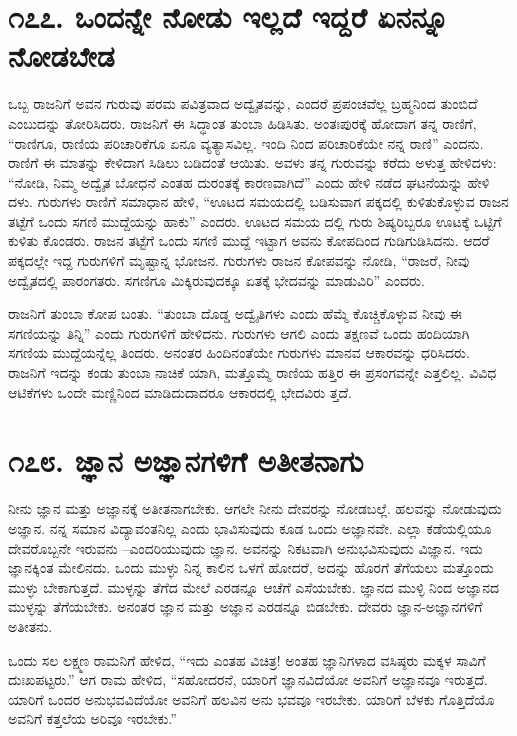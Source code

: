 \section{\num{೧೭೭. } ಒಂದನ್ನೇ ನೋಡು ಇಲ್ಲದೆ ಇದ್ದರೆ ಏನನ್ನೂ ನೋಡಬೇಡ}

ಒಬ್ಬ ರಾಜನಿಗೆ ಅವನ ಗುರುವು ಪರಮ ಪವಿತ್ರವಾದ ಅದ್ವೈತವನ್ನು, ಎಂದರೆ ಪ್ರಪಂಚವೆಲ್ಲ ಬ್ರಹ್ಮನಿಂದ ತುಂಬಿದೆ ಎಂಬುದನ್ನು ತೋರಿಸಿದರು. ರಾಜನಿಗೆ ಈ ಸಿದ್ಧಾಂತ ತುಂಬಾ ಹಿಡಿಸಿತು. ಅಂತಃಪುರಕ್ಕೆ ಹೋದಾಗ ತನ್ನ ರಾಣಿಗೆ, “ರಾಣಿಗೂ, ರಾಣಿಯ ಪರಿಚಾರಿಕೆಗೂ ಏನೂ ವ್ಯತ್ಯಾಸವಿಲ್ಲ. ಇಂದಿ ನಿಂದ ಪರಿಚಾರಿಕೆಯೇ ನನ್ನ ರಾಣಿ” ಎಂದನು. ರಾಣಿಗೆ ಈ ಮಾತನ್ನು ಕೇಳಿದಾಗ ಸಿಡಿಲು ಬಡಿದಂತೆ ಆಯಿತು. ಅವಳು ತನ್ನ ಗುರುವನ್ನು ಕರೆದು ಅಳುತ್ತ ಹೇಳಿದಳು: “ನೋಡಿ, ನಿಮ್ಮ ಅದ್ವೈತ ಬೋಧನೆ ಎಂತಹ ದುರಂತಕ್ಕೆ ಕಾರಣವಾಗಿದೆ” ಎಂದು ಹೇಳಿ ನಡೆದ ಘಟನೆಯನ್ನು ಹೇಳಿ ದಳು. ಗುರುಗಳು ರಾಣಿಗೆ ಸಮಾಧಾನ ಹೇಳಿ, “ಊಟದ ಸಮಯದಲ್ಲಿ ಬಡಿಸುವಾಗ ಪಕ್ಕದಲ್ಲಿ ಕುಳಿತುಕೊಳ್ಳುವ ರಾಜನ ತಟ್ಟೆಗೆ ಒಂದು ಸಗಣಿ ಮುದ್ದೆಯನ್ನು ಹಾಕು” ಎಂದರು. ಊಟದ ಸಮಯ ದಲ್ಲಿ ಗುರು ಶಿಷ್ಯರಿಬ್ಬರೂ ಊಟಕ್ಕೆ ಒಟ್ಟಿಗೆ ಕುಳಿತು ಕೊಂಡರು. ರಾಜನ ತಟ್ಟೆಗೆ ಒಂದು ಸಗಣಿ ಮುದ್ದೆ ಇಟ್ಟಾಗ ಅವನು ಕೋಪದಿಂದ ಗುಡಿಗುಡಿಸಿದನು. ಆದರೆ ಪಕ್ಕದಲ್ಲೇ ಇದ್ದ ಗುರುಗಳಿಗೆ ಮೃಷ್ಟಾನ್ನ ಭೋಜನ. ಗುರುಗಳು ರಾಜನ ಕೋಪವನ್ನು ನೋಡಿ, “ರಾಜರೆ, ನೀವು ಅದ್ವೈತದಲ್ಲಿ ಪಾರಂಗತರು. ಸಗಣಿಗೂ ಮಿಕ್ಕಿರುವುದಕ್ಕೂ ಏತಕ್ಕೆ ಭೇದವನ್ನು ಮಾಡುವಿರಿ” ಎಂದರು.

ರಾಜನಿಗೆ ತುಂಬಾ ಕೋಪ ಬಂತು. “ತುಂಬಾ ದೊಡ್ಡ ಅದ್ವೈತಿಗಳು ಎಂದು ಹೆಮ್ಮೆ ಕೊಚ್ಚಿಕೊಳ್ಳುವ ನೀವು ಈ ಸಗಣಿಯನ್ನು ತಿನ್ನಿ” ಎಂದು ಗುರುಗಳಿಗೆ ಹೇಳಿದನು. ಗುರುಗಳು ಆಗಲಿ ಎಂದು ತಕ್ಷಣವೆ ಒಂದು ಹಂದಿಯಾಗಿ ಸಗಣಿಯ ಮುದ್ದೆಯನ್ನೆಲ್ಲ ತಿಂದರು. ಅನಂತರ ಹಿಂದಿನಂತೆಯೇ ಗುರುಗಳು ಮಾನವ ಆಕಾರವನ್ನು ಧರಿಸಿದರು. ರಾಜನಿಗೆ ಇದನ್ನು ಕಂಡು ತುಂಬಾ ನಾಚಿಕೆ ಯಾಗಿ, ಮತ್ತೊಮ್ಮೆ ರಾಣಿಯ ಹತ್ತಿರ ಈ ಪ್ರಸಂಗವನ್ನೇ ಎತ್ತಲಿಲ್ಲ. ವಿವಿಧ ಆಟಿಕೆಗಳು ಒಂದೇ ಮಣ್ಣಿನಿಂದ ಮಾಡಿದುದಾದರೂ ಆಕಾರದಲ್ಲಿ ಭೇದವಿರು ತ್ತದೆ.


\section{\num{೧೭೮. } ಜ್ಞಾನ ಅಜ್ಞಾನಗಳಿಗೆ ಅತೀತನಾಗು}

ನೀನು ಜ್ಞಾನ ಮತ್ತು ಅಜ್ಞಾನಕ್ಕೆ ಅತೀತನಾಗಬೇಕು. ಆಗಲೇ ನೀನು ದೇವರನ್ನು ನೋಡಬಲ್ಲೆ. ಹಲವನ್ನು ನೋಡುವುದು ಅಜ್ಞಾನ. ನನ್ನ ಸಮಾನ ವಿದ್ಯಾವಂತನಿಲ್ಲ ಎಂದು ಭಾವಿಸುವುದು ಕೂಡ ಒಂದು ಅಜ್ಞಾನವೇ. ಎಲ್ಲಾ ಕಡೆಯಲ್ಲಿಯೂ ದೇವರೊಬ್ಬನೇ ಇರುವನು –ಎಂದರಿಯುವುದು ಜ್ಞಾನ. ಅವನನ್ನು ನಿಕಟವಾಗಿ ಅನುಭವಿಸುವುದು ವಿಜ್ಞಾನ. ಇದು ಜ್ಞಾನಕ್ಕಿಂತ ಮೇಲಿನದು. ಒಂದು ಮುಳ್ಳು ನಿನ್ನ ಕಾಲಿನ ಒಳಗೆ ಹೋದರೆ, ಅದನ್ನು ಹೊರಗೆ ತೆಗೆಯಲು ಮತ್ತೊಂದು ಮುಳ್ಳು ಬೇಕಾಗುತ್ತದೆ. ಮುಳ್ಳನ್ನು ತೆಗೆದ ಮೇಲೆ ಎರಡನ್ನೂ ಆಚೆಗೆ ಎಸೆಯಬೇಕು. ಜ್ಞಾನದ ಮುಳ್ಳಿ ನಿಂದ ಅಜ್ಞಾನದ ಮುಳ್ಳನ್ನು ತೆಗೆಯಬೇಕು. ಅನಂತರ ಜ್ಞಾನ ಮತ್ತು ಅಜ್ಞಾನ ಎರಡನ್ನೂ ಬಿಡಬೇಕು. ದೇವರು ಜ್ಞಾನ-ಅಜ್ಞಾನಗಳಿಗೆ ಅತೀತನು.

ಒಂದು ಸಲ ಲಕ್ಷ್ಮಣ ರಾಮನಿಗೆ ಹೇಳಿದ, “ಇದು ಎಂತಹ ವಿಚಿತ್ರ! ಅಂತಹ ಜ್ಞಾನಿಗಳಾದ ವಸಿಷ್ಠರು ಮಕ್ಕಳ ಸಾವಿಗೆ ದುಃಖಪಟ್ಟರು.” ಆಗ ರಾಮ ಹೇಳಿದ, “ಸಹೋದರನೆ, ಯಾರಿಗೆ ಜ್ಞಾನವಿದೆಯೋ ಅವನಿಗೆ ಅಜ್ಞಾನವೂ ಇರುತ್ತದೆ. ಯಾರಿಗೆ ಒಂದರ ಅನುಭವವಿದೆಯೋ ಅವನಿಗೆ ಹಲವಿನ ಅನು ಭವವೂ ಇರಬೇಕು. ಯಾರಿಗೆ ಬೆಳಕು ಗೊತ್ತಿದೆಯೊ ಅವನಿಗೆ ಕತ್ತಲೆಯ ಅರಿವೂ ಇರಬೇಕು.”

